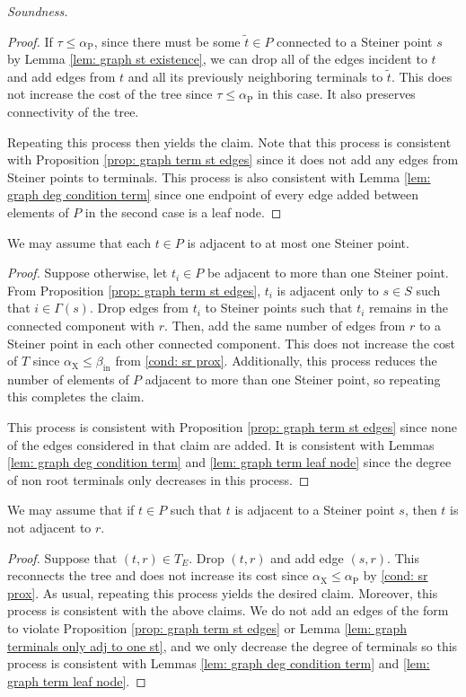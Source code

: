 \documentclass{article}\providecommand{\DeclareRedundantLanguages}[2]{}\usepackage[a4paper,margin=20mm]{geometry}
\newcommand{\1}{\textbf{1}}
\newcommand{\td}{\tau}
\newcommand{\srd}{\alpha_{\text{X}}}
\newcommand{\trd}{\alpha_{\text{P}}}
\renewcommand{\tilde}{\widetilde}
\begin{document}
\begin{paragraph}{\textit{Soundness.}}
\begin{proof}
  If $\td \leq \trd$, since there must be some $\tilde{t} \in P$ connected to a Steiner point $s$ by Lemma \ref{lem: graph st existence}, we can drop all of the edges incident to $t$ and add edges from $t$ and all its previously neighboring terminals to $\tilde{t}$. 
  This does not increase the cost of the tree since $\td \leq \trd$ in this case. It also preserves connectivity of the tree.
  
  Repeating this process then yields the claim. Note that this process is consistent with Proposition \ref{prop: graph term st edges} since it does not add any edges from Steiner points to terminals. This process is also consistent with Lemma \ref{lem: graph deg condition term} since one endpoint of every edge added between elements of $P$ in the second case is a leaf node.
 \end{proof}
 

 \begin{lemma} \label{lem: graph terminals only adj to one st}
 We may assume that each $t \in P$ is adjacent to at most one Steiner point.
 \end{lemma}
 \begin{proof}
  Suppose otherwise, let $t_i \in P$ be adjacent to more than one Steiner point. From Proposition \ref{prop: graph term st edges}, $t_i$ is adjacent only to $s \in S$ such that $i \in \Gamma(s)$. Drop edges from $t_i$ to Steiner points such that $t_i$ remains in the connected component with $r$. Then, add the same number of edges from $r$ to a Steiner point in each other connected component. This does not increase the cost of $T$ since $\srd \leq \beta_{\text{in}}$ from \ref{cond: sr prox}. Additionally, this process reduces the number of elements of $P$ adjacent to more than one Steiner point, so repeating this completes the claim.
  
  This process is consistent with Proposition \ref{prop: graph term st edges} since none of the edges considered in that claim are added. It is consistent with Lemmas \ref{lem: graph deg condition term} and \ref{lem: graph term leaf node} since the degree of non root terminals only decreases in this process.
 \end{proof}
 
 
 \begin{proposition} \label{prop: graph terminals not adj to r if in triangle}
 We may assume that if $t \in P$ such that $t$ is adjacent to a Steiner point $s$, then $t$ is not adjacent to $r$.
 \end{proposition}
 \begin{proof}
 Suppose that $(t,r) \in T_E$. Drop $(t,r)$ and add edge $(s,r)$. This reconnects the tree and does not increase its cost since $\srd \leq \trd$ by \ref{cond: sr prox}. As usual, repeating this process yields the desired claim. Moreover, this process is consistent with the above claims. We do not add an edges of the form to violate Proposition \ref{prop: graph term st edges} or Lemma \ref{lem: graph terminals only adj to one st}, and we only decrease the degree of terminals so this process is consistent with Lemmas \ref{lem: graph deg condition term} and \ref{lem: graph term leaf node}.
 \end{proof}
 

\end{paragraph}
\end{document}
